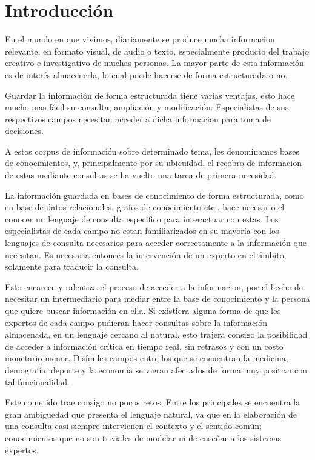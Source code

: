 \chapter*{Introducción}\label{chapter:introduction}

En el mundo en que vivimos, diariamente se produce mucha informacion relevante, en formato visual, de audio o texto, especialmente producto del trabajo creativo e investigativo de muchas personas. La mayor parte de esta información es de interés almacenerla, lo cual puede hacerse de forma estructurada o no.

Guardar la información de forma estructurada tiene varias ventajas, esto hace mucho mas fácil su consulta, ampliación y modificación. Especialistas de sus respectivos campos necesitan acceder a dicha informacion para toma de decisiones.

A estos corpus de información sobre determinado tema, les denominamos bases de conocimientos, y, principalmente por su ubicuidad, el recobro de informacion de estas mediante consultas se ha vuelto una tarea de primera necesidad.

La información guardada en bases de conocimiento de forma estructurada, como en base de datos relacionales, grafos de conocimiento etc., hace necesario el conocer un lenguaje de consulta especifico para interactuar con estas. Los especialistas de cada campo no estan familiarizados en su mayoría con los lenguajes de consulta necesarios para acceder correctamente a la información que necesitan. Es necesaria entonces la intervención de un experto en el ámbito, solamente para traducir la consulta.

Esto encarece y ralentiza el proceso de acceder a la informacion, por el hecho de necesitar un intermediario para mediar entre la base de conocimiento y la persona que quiere buscar información en ella. Si existiera alguna forma de que los expertos de cada campo pudieran hacer consultas sobre la información almacenada, en un lenguaje cercano al natural, esto trajera consigo la posibilidad de acceder a información crítica en tiempo real, sin retrasos y con un costo monetario menor. Disímiles campos entre los que se encuentran la medicina, demografía, deporte y la economía se vieran afectados de forma muy positiva con tal funcionalidad.

Este cometido trae consigo no pocos retos. Entre los principales se encuentra la gran ambiguedad que presenta el lenguaje natural, ya que en la elaboración de una consulta casi siempre intervienen el contexto y el sentido común; conocimientos que no son triviales de modelar ni de enseñar a los sistemas expertos.

